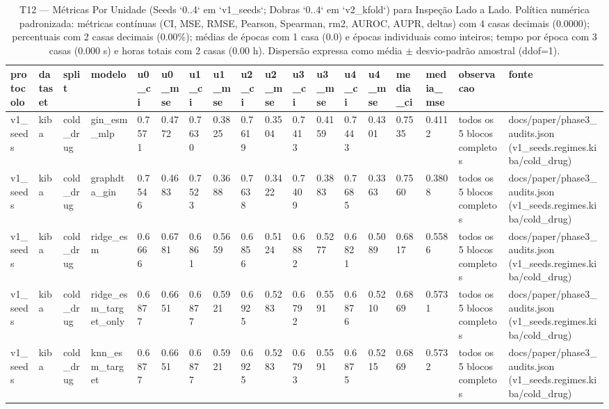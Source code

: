 \begin{table}[htbp]
\centering
\small
\caption{T12 — Métricas Por Unidade (Seeds `0..4` em `v1\_seeds`; Dobras `0..4` em `v2\_kfold`) para Inspeção Lado a Lado. Política numérica padronizada: métricas contínuas (CI, MSE, RMSE, Pearson, Spearman, rm2, AUROC, AUPR, deltas) com 4 casas decimais (0.0000); percentuais com 2 casas decimais (0.00\%); médias de épocas com 1 casa (0.0) e épocas individuais como inteiros; tempo por época com 3 casas (0.000 s) e horas totais com 2 casas (0.00 h). Dispersão expressa como média $\pm$ desvio-padrão amostral (ddof=1).}
\label{tab:t12_phase3_per_fold_or_seed}
\begin{tabular}{llllllllllllllllll}
\toprule
\textbf{protocolo} & \textbf{dataset} & \textbf{split} & \textbf{modelo} & \textbf{u0\_ci} & \textbf{u0\_mse} & \textbf{u1\_ci} & \textbf{u1\_mse} & \textbf{u2\_ci} & \textbf{u2\_mse} & \textbf{u3\_ci} & \textbf{u3\_mse} & \textbf{u4\_ci} & \textbf{u4\_mse} & \textbf{media\_ci} & \textbf{media\_mse} & \textbf{observacao} & \textbf{fonte} \\
\midrule
v1\_seeds & kiba & cold\_drug & gin\_esm\_mlp & 0.7571 & 0.4772 & 0.7630 & 0.3825 & 0.7619 & 0.3504 & 0.7413 & 0.4159 & 0.7443 & 0.4301 & 0.7535 & 0.4112 & todos os 5 blocos completos & docs/paper/phase3\_audits.json (v1\_seeds.regimes.kiba/cold\_drug) \\
v1\_seeds & kiba & cold\_drug & graphdta\_gin & 0.7546 & 0.4683 & 0.7523 & 0.3688 & 0.7638 & 0.3422 & 0.7409 & 0.3883 & 0.7685 & 0.3363 & 0.7560 & 0.3808 & todos os 5 blocos completos & docs/paper/phase3\_audits.json (v1\_seeds.regimes.kiba/cold\_drug) \\
v1\_seeds & kiba & cold\_drug & ridge\_esm & 0.6666 & 0.6781 & 0.6861 & 0.5659 & 0.6856 & 0.5124 & 0.6882 & 0.5277 & 0.6821 & 0.5089 & 0.6817 & 0.5586 & todos os 5 blocos completos & docs/paper/phase3\_audits.json (v1\_seeds.regimes.kiba/cold\_drug) \\
v1\_seeds & kiba & cold\_drug & ridge\_esm\_target\_only & 0.6877 & 0.6651 & 0.6877 & 0.5921 & 0.6925 & 0.5283 & 0.6792 & 0.5591 & 0.6876 & 0.5210 & 0.6869 & 0.5731 & todos os 5 blocos completos & docs/paper/phase3\_audits.json (v1\_seeds.regimes.kiba/cold\_drug) \\
v1\_seeds & kiba & cold\_drug & knn\_esm\_target & 0.6877 & 0.6651 & 0.6877 & 0.5921 & 0.6925 & 0.5283 & 0.6793 & 0.5591 & 0.6875 & 0.5215 & 0.6869 & 0.5732 & todos os 5 blocos completos & docs/paper/phase3\_audits.json (v1\_seeds.regimes.kiba/cold\_drug) \\

\end{tabular}
\end{table}
